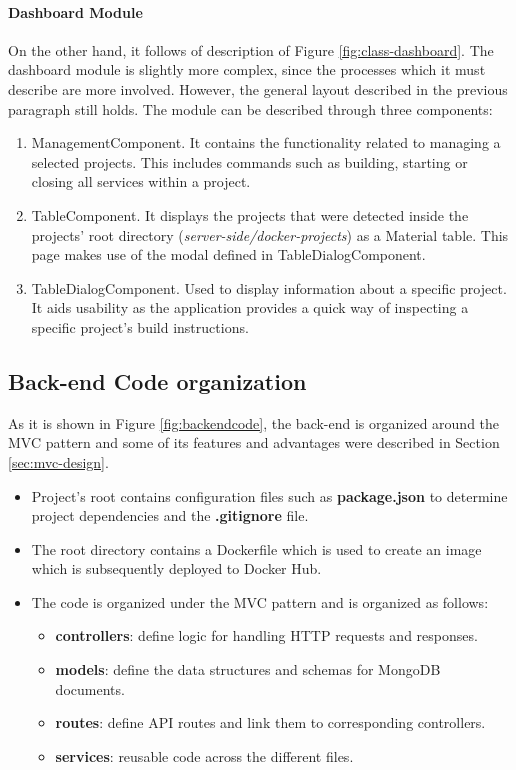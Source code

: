 \documentclass[multi, tikz, a4paper, oneside]{article}
\begin{document}
\paragraph{Dashboard Module}
On the other hand, it follows of description of Figure
\ref{fig:class-dashboard}. The dashboard module is slightly more complex, since
the processes which it must describe are more involved. However, the general
layout described in the previous paragraph still holds. The module can be
described through three components:

\begin{enumerate}
\item ManagementComponent. It contains the functionality related to managing a
  selected projects. This includes commands such as building, starting or
  closing all services within a project.
\item TableComponent. It displays the projects that were detected inside the
  projects' root directory ({\em{server-side/docker-projects}}) as a Material
  table. This page makes use of the modal defined in TableDialogComponent.
\item TableDialogComponent. Used to display information about a specific
  project. It aids usability as the application provides a quick way of
  inspecting a specific project's build instructions.
\end{enumerate}


\subsection{Back-end Code organization}
As it is shown in Figure \ref{fig:backendcode}, the back-end is organized around
the MVC pattern and some of its features and advantages were described in
Section \ref{sec:mvc-design}.

\begin{itemize}
\item Project's root contains configuration files such as \textbf{package.json}
  to determine project dependencies and the \textbf{.gitignore} file.
\item The root directory contains a Dockerfile which is used to create an image
  which is subsequently deployed to Docker Hub.
\item The code is organized under the MVC pattern and is organized as follows:
  \begin{itemize}
  \item \textbf{controllers}: define logic for handling HTTP requests and
    responses.
  \item \textbf{models}: define the data structures and schemas for MongoDB
    documents.
  \item \textbf{routes}: define API routes and link them to corresponding
    controllers.
  \item \textbf{services}: reusable code across the different files.
  \end{itemize}
\end{itemize}
\end{document}
